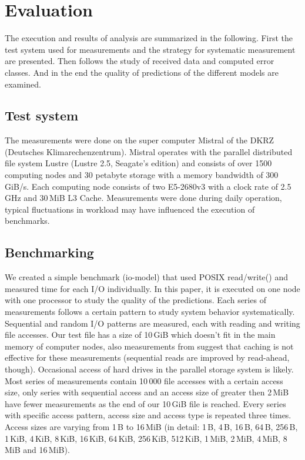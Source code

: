 \documentclass{superfri}
\begin{document}
\section{Evaluation}
The execution and results of analysis are summarized in the following.
First the test system used for measurements and the strategy for systematic measurement are presented.
Then follows the study of received data and computed error classes.
And in the end the quality of predictions of the different models are examined.

\subsection{Test system}
The measurements were done on the super computer Mistral of the DKRZ (Deutsches Klimarechenzentrum).
Mistral operates with the parallel distributed file system Lustre (Lustre 2.5, Seagate's edition) and consists of over 1500 computing nodes and 30 petabyte storage with a memory bandwidth of 300\,GiB/s.
Each computing node consists of two E5-2680v3 with a clock rate of 2.5\,GHz and 30\,MiB L3 Cache.
Measurements were done during daily operation, typical fluctuations in workload may have influenced the execution of benchmarks.

\subsection{Benchmarking}
We created a simple benchmark (io-model) that used POSIX read/write() and measured time for each I/O individually.
In this paper, it is executed on one node with one processor to study the quality of the predictions.
Each series of measurements follows a certain pattern to study system behavior systematically.\\
Sequential and random I/O patterns are measured, each with reading and writing file accesses.
Our test file has a size of 10\,GiB which doesn't fit in the main memory of computer nodes, also measurements from  suggest that caching is not effective for these measurements (sequential reads are improved by read-ahead, though).
Occasional access of hard drives in the parallel storage system is likely.
Most series of measurements contain 10\,000 file accesses with a certain access size, only series with sequential access and an access size of greater then 2\,MiB have fewer measurements as the end of our 10\,GiB file is reached.
Every series with specific access pattern, access size and access type is repeated three times.
Access sizes are varying from 1\,B to 16\,MiB (in detail:  1\,B, 4\,B, 16\,B, 64\,B, 256\,B, 1\,KiB, 4\,KiB, 8\,KiB, 16\,KiB, 64\,KiB, 256\,KiB, 512\,KiB, 1\,MiB, 2\,MiB, 4\,MiB, 8\,MiB and 16\,MiB).
\end{document}
